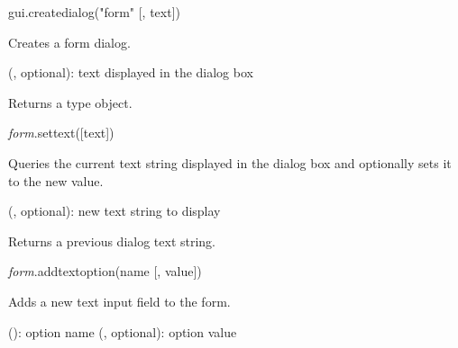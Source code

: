 \documentclass[a4paper,12pt,twoside,extrafontsizes]{memoir}
\begin{document}

\begin{luafuncprototype}
gui.createdialog("form" [, text])
\end{luafuncprototype}

\begin{funcdescr}
	Creates a form dialog.
\end{funcdescr}

\begin{funcparams}
	 (, optional): text displayed in the dialog box
\end{funcparams}

\begin{funcret}
	Returns a  type object.
\end{funcret}


\begin{luafuncprototype}
\emph{form}.settext([text])
\end{luafuncprototype}

\begin{funcdescr}
	Queries the current text string displayed in the dialog box and optionally sets it to the new value.
\end{funcdescr}

\begin{funcparams}
	 (, optional): new text string to display
\end{funcparams}

\begin{funcret}
	Returns a previous dialog text string.
\end{funcret}


\begin{luafuncprototype}
\emph{form}.addtextoption(name [, value])
\end{luafuncprototype}

\begin{funcdescr}
	Adds a new text input field to the form.
\end{funcdescr}

\begin{funcparams}
	 (): option name
	 (, optional): option value
\end{funcparams}
\end{document}
